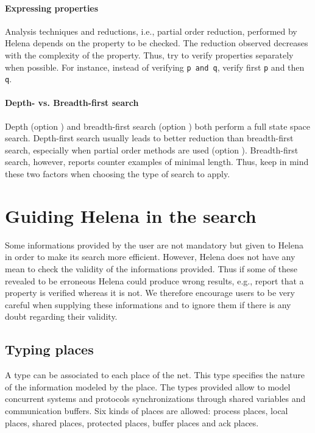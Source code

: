\paragraph{Expressing properties}
Analysis techniques and reductions, i.e., partial order reduction,
performed by Helena depends on the property to be checked.  The
reduction observed decreases with the complexity of the property.
Thus, try to verify properties separately when possible.  For
instance, instead of verifying \lstinline{p and q}, verify first
\lstinline{p} and then \lstinline{q}.


\paragraph{Depth- vs. Breadth-first search}
Depth (option ) and breadth-first search (option
) both perform a full state space search.
Depth-first search usually leads to better reduction than
breadth-first search, especially when partial order methods are used
(option ).  Breadth-first search, however,
reports counter examples of minimal length.  Thus, keep in mind these
two factors when choosing the type of search to apply.


\section{Guiding Helena in the search}
\label{sec:helping-helena}
Some informations provided by the user are not mandatory but given to
Helena in order to make its search more efficient.  However, Helena
does not have any mean to check the validity of the informations
provided.  Thus if some of these revealed to be erroneous Helena could
produce wrong results, e.g., report that a property is verified
whereas it is not.  We therefore encourage users to be very careful
when supplying these informations and to ignore them if there is any
doubt regarding their validity.

\subsection{Typing places}
A type can be associated to each place of the net. This type specifies
the nature of the information modeled by the place. The types provided
allow to model concurrent systems and protocols synchronizations through
shared variables and communication buffers. Six kinds of places are
allowed: process places, local places, shared places, protected
places, buffer places and ack places.

